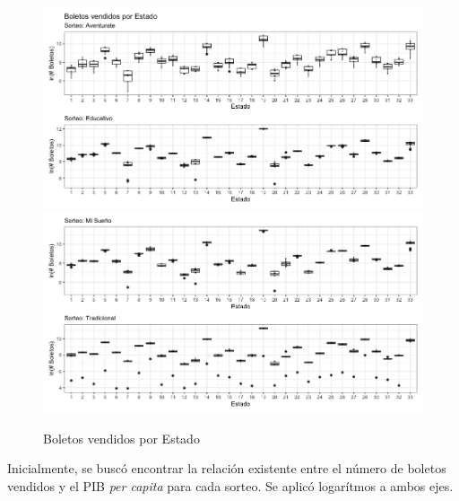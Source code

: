 \begin{figure}[H]
    \caption{Boletos vendidos por Estado}
    \label{fig:boxplot}
    \includegraphics[scale = 0.43]{Imagenes/boxplot1.png}
    \includegraphics[scale = 0.43]{Imagenes/boxplot2.png}
    \centering
\end{figure}

\newpage

Inicialmente, se buscó encontrar la relación existente entre el número de boletos vendidos y el PIB \textit{per capita} para cada sorteo. Se aplicó logarítmos a ambos ejes.

